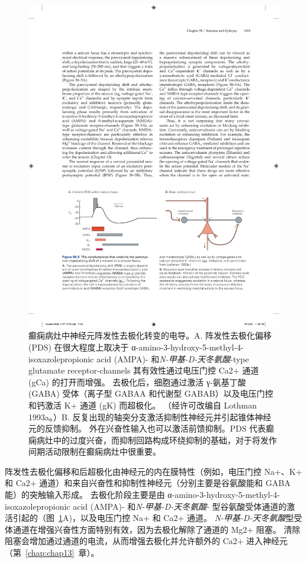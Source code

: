 \begin{figure}[htbp]
	\centering
	\includegraphics[width=0.9\linewidth]{chap58/fig_58_5}
	\caption{癫痫病灶中神经元阵发性去极化转变的电导。A. 阵发性去极化偏移 (PDS) 在很大程度上取决于 α-amino-3-hydroxy-5-methyl-4-isoxazolepropionic acid (AMPA)- 和\textit{N-甲基-D-天冬氨酸}-type glutamate receptor-channels 其有效性通过电压门控 Ca2+ 通道 (gCa) 的打开而增强。 去极化后，细胞通过激活 γ-氨基丁酸 (GABA) 受体（离子型 GABAA 和代谢型 GABAB）以及电压门控和钙激活 K+ 通道 (gK) 而超极化。 （经许可改编自 Lothman 1993a。）B. 反复出现的轴突分支激活抑制性神经元并引起锥体神经元的反馈抑制。 外在兴奋性输入也可以激活前馈抑制。PDS 代表癫痫病灶中的过度兴奋，而抑制回路构成环绕抑制的基础，对于将发作间期活动限制在癫痫病灶中很重要。}
	\label{fig:58_5}
\end{figure}


阵发性去极化偏移和后超极化由神经元的内在膜特性（例如，电压门控 Na+、K+ 和 Ca2+ 通道）和来自兴奋性和抑制性神经元（分别主要是谷氨酸能和 GABA 能）的突触输入形成。
去极化阶段主要是由 α-amino-3-hydroxy-5-methyl-4-isoxazolepropionic acid (AMPA)- 和\textit{N-甲基-D-天冬氨酸}- 型谷氨酸受体通道的激活引起的（图~\ref{fig:58_5}A)，以及电压门控 Na+ 和 Ca2+ 通道。
\textit{N-甲基-D-天冬氨酸}型受体通道在增强兴奋性方面特别有效，因为去极化解除了通道的 Mg2+ 阻塞。
清除阻塞会增加通过通道的电流，从而增强去极化并允许额外的 Ca2+ 进入神经元（第~\ref{chap:chap13}~章）。


